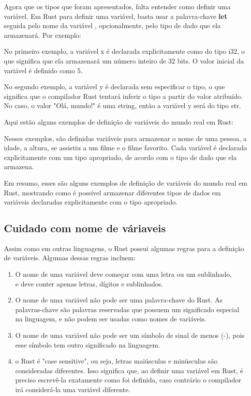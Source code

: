 \documentclass[12pt,a4paper,oneside]{abntex2}
\begin{document}
Agora que os tipos que foram apresentados, falta entender como definir uma variável. Em Rust 
para definir uma variável, basta usar a palavra-chave \textbf{let} seguida pelo nome da variável , opcionalmente, pelo tipo de dado que ela armazenará. Por exemplo:


No primeiro exemplo, a variável x é declarada explicitamente como do tipo i32, o que significa que ela armazenará um número inteiro de 32 bits. O valor inicial da variável é definido como 5.

No segundo exemplo, a variável y é declarada sem especificar o tipo, o que significa que o compilador Rust tentará inferir o tipo a partir do valor atribuído. No caso, o valor "Olá, mundo!" é uma string, então a variável y será do tipo str.

Aqui estão alguns exemplos de definição de variáveis do mundo real em Rust:



Nesses exemplos, são definidas variáveis para armazenar o nome de uma pessoa, a idade, a altura, se assistiu a um filme e o filme favorito. Cada variável é declarada explicitamente com um tipo apropriado, de acordo com o tipo de dado que ela armazena.

Em resumo, esses são alguns exemplos de definição de variáveis do mundo real em Rust, mostrando como é possível armazenar diferentes tipos de dados em variáveis declaradas explicitamente com o tipo apropriado.



\subsection{Cuidado com nome de váriaveis}

 Assim como em outras linguagens, o Rust possui algumas regras para a definição de variáveis. Algumas dessas regras incluem:
\begin{enumerate}
    \item O nome de uma variável deve começar com uma letra ou um sublinhado, \\ e deve conter apenas letras, dígitos e sublinhados.
    \item O nome de uma variável não pode ser uma palavra-chave do Rust. As palavras-chave são palavras reservadas que possuem um significado especial na linguagem, e não podem ser usadas como nomes de variáveis.
    \item O nome de uma variável não pode ser um símbolo de sinal de menos (-), pois esse símbolo tem outro significado na linguagem.
    \item o Rust é "case sensitive", ou seja, letras maiúsculas e minúsculas são consideradas diferentes. Isso significa que, ao definir uma variável em Rust, é preciso escrevê-la exatamente como foi definida, caso contrário o compilador irá considerá-la uma variável diferente.

\end{enumerate}
\end{document}
